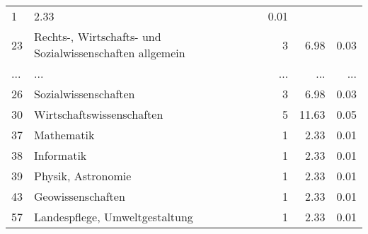 \begin{longtable}{lXrrr}
          \num{1} &
          \num[round-mode=places,round-precision=2]{2.33} &
          \num[round-mode=places,round-precision=2]{0.01} \\
        23 & \multicolumn{1}{X}{Rechts-, Wirtschafts- und Sozialwissenschaften allgemein} & %
          \num{3} &
          \num[round-mode=places,round-precision=2]{6.98} &
          \num[round-mode=places,round-precision=2]{0.03} \\
       ... & ... & ... & ... & ... \\
        26 & \multicolumn{1}{X}{Sozialwissenschaften} & %
          \num{3} &
          \num[round-mode=places,round-precision=2]{6.98} &
          \num[round-mode=places,round-precision=2]{0.03} \\

        30 & \multicolumn{1}{X}{Wirtschaftswissenschaften} & %
          \num{5} &
          \num[round-mode=places,round-precision=2]{11.63} &
          \num[round-mode=places,round-precision=2]{0.05} \\

        37 & \multicolumn{1}{X}{Mathematik} & %
          \num{1} &
          \num[round-mode=places,round-precision=2]{2.33} &
          \num[round-mode=places,round-precision=2]{0.01} \\

        38 & \multicolumn{1}{X}{Informatik} & %
          \num{1} &
          \num[round-mode=places,round-precision=2]{2.33} &
          \num[round-mode=places,round-precision=2]{0.01} \\

        39 & \multicolumn{1}{X}{Physik, Astronomie} & %
          \num{1} &
          \num[round-mode=places,round-precision=2]{2.33} &
          \num[round-mode=places,round-precision=2]{0.01} \\

        43 & \multicolumn{1}{X}{Geowissenschaften} & %
          \num{1} &
          \num[round-mode=places,round-precision=2]{2.33} &
          \num[round-mode=places,round-precision=2]{0.01} \\

        57 & \multicolumn{1}{X}{Landespflege, Umweltgestaltung} & %
          \num{1} &
          \num[round-mode=places,round-precision=2]{2.33} &
          \num[round-mode=places,round-precision=2]{0.01} \\


\end{longtable}
